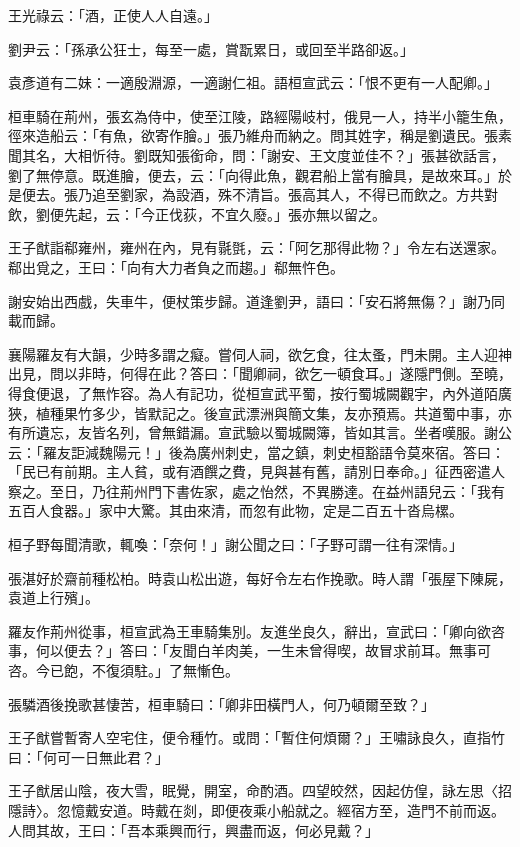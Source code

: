王光祿云：「酒，正使人人自遠。」

劉尹云：「孫承公狂士，每至一處，賞翫累日，或回至半路卻返。」

袁彥道有二妹：一適殷淵源，一適謝仁祖。語桓宣武云：「恨不更有一人配卿。」

桓車騎在荊州，張玄為侍中，使至江陵，路經陽岐村，俄見一人，持半小籠生魚，徑來造船云：「有魚，欲寄作膾。」張乃維舟而納之。問其姓字，稱是劉遺民。張素聞其名，大相忻待。劉既知張銜命，問：「謝安、王文度並佳不？」張甚欲話言，劉了無停意。既進膾，便去，云：「向得此魚，觀君船上當有膾具，是故來耳。」於是便去。張乃追至劉家，為設酒，殊不清旨。張高其人，不得已而飲之。方共對飲，劉便先起，云：「今正伐荻，不宜久廢。」張亦無以留之。

王子猷詣郗雍州，雍州在內，見有毾㲪，云：「阿乞那得此物？」令左右送還家。郗出覓之，王曰：「向有大力者負之而趨。」郗無忤色。

謝安始出西戲，失車牛，便杖策步歸。道逢劉尹，語曰：「安石將無傷？」謝乃同載而歸。

襄陽羅友有大韻，少時多謂之癡。嘗伺人祠，欲乞食，往太蚤，門未開。主人迎神出見，問以非時，何得在此？答曰：「聞卿祠，欲乞一頓食耳。」遂隱門側。至曉，得食便退，了無怍容。為人有記功，從桓宣武平蜀，按行蜀城闕觀宇，內外道陌廣狹，植種果竹多少，皆默記之。後宣武漂洲與簡文集，友亦預焉。共道蜀中事，亦有所遺忘，友皆名列，曾無錯漏。宣武驗以蜀城闕簿，皆如其言。坐者嘆服。謝公云：「羅友詎減魏陽元！」後為廣州刺史，當之鎮，刺史桓豁語令莫來宿。答曰：「民已有前期。主人貧，或有酒饌之費，見與甚有舊，請別日奉命。」征西密遣人察之。至日，乃往荊州門下書佐家，處之怡然，不異勝達。在益州語兒云：「我有五百人食器。」家中大驚。其由來清，而忽有此物，定是二百五十沓烏樏。

桓子野每聞清歌，輒喚：「奈何！」謝公聞之曰：「子野可謂一往有深情。」

張湛好於齋前種松柏。時袁山松出遊，每好令左右作挽歌。時人謂「張屋下陳屍，袁道上行殯」。

羅友作荊州從事，桓宣武為王車騎集別。友進坐良久，辭出，宣武曰：「卿向欲咨事，何以便去？」答曰：「友聞白羊肉美，一生未曾得喫，故冒求前耳。無事可咨。今已飽，不復須駐。」了無慚色。

張驎酒後挽歌甚悽苦，桓車騎曰：「卿非田橫門人，何乃頓爾至致？」

王子猷嘗暫寄人空宅住，便令種竹。或問：「暫住何煩爾？」王嘯詠良久，直指竹曰：「何可一日無此君？」

王子猷居山陰，夜大雪，眠覺，開室，命酌酒。四望皎然，因起仿偟，詠左思〈招隱詩〉。忽憶戴安道。時戴在剡，即便夜乘小船就之。經宿方至，造門不前而返。人問其故，王曰：「吾本乘興而行，興盡而返，何必見戴？」

